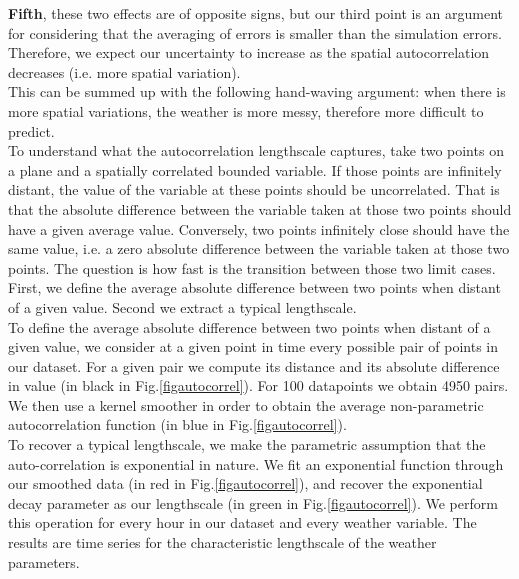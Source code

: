 \textbf{Fifth}, these two effects are of opposite signs, but our third point is an argument for considering that the averaging of errors is smaller than the simulation errors. Therefore, we expect our uncertainty to increase as the spatial autocorrelation decreases (i.e. more spatial variation). \\

This can be summed up with the following hand-waving argument: when there is more spatial variations, the weather is more messy, therefore more difficult to predict. \\

To understand what the autocorrelation lengthscale captures, take two points on a plane and a spatially correlated bounded variable. If those points are infinitely distant, the value of the variable at these points should be uncorrelated. That is that the absolute difference between the variable taken at those two points should have a given average value. Conversely, two points infinitely close should have the same value, i.e. a zero absolute difference between the variable taken at those two points. The question is how fast is the transition between those two limit cases. First, we define the average absolute difference between two points when distant of a given value. Second we extract a typical lengthscale. \\

To define the average absolute difference between two points when distant of a given value, we consider at a given point in time every possible pair of points in our dataset. For a given pair we compute its distance and its absolute difference in value (in black in Fig.\ref{figautocorrel}). For 100 datapoints we obtain 4950 pairs. We then use a kernel smoother in order to obtain the average non-parametric autocorrelation function (in blue in Fig.\ref{figautocorrel}). \\

To recover a typical lengthscale, we make the parametric assumption that the auto-correlation is exponential in nature. We fit an exponential function through our smoothed data (in red in Fig.\ref{figautocorrel}), and recover the exponential decay parameter as our lengthscale (in green in Fig.\ref{figautocorrel}). We perform this operation for every hour in our dataset and every weather variable. The results are time series for the characteristic lengthscale of the weather parameters.


